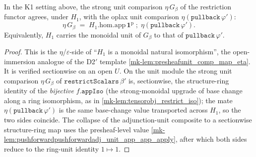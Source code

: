 \begin{lemma}\label{mk-lem:pushforward_eta_appiso_collapse}
  \leanok

  In the K1 setting above, the strong unit comparison \(\eta\,G_\beta\) of the restriction functor
  agrees, under \(H_1\), with the oplax unit comparison \(\eta(\mathtt{pullback}\,\varphi')\):
  \[
    \eta\,G_\beta
    \;=\;
    H_1.\mathrm{hom}.\mathrm{app}\,\mathbf{1}^{\mathrm p}
    \;\mathbin{;}\;
    \eta(\mathtt{pullback}\,\varphi').
  \]
  Equivalently, \(H_1\) carries the monoidal unit of \(G_\beta\) to that of
  \(\mathtt{pullback}\,\varphi'\).
\end{lemma}
\begin{proof}
  \leanok
  This is the $\eta$/$\varepsilon$-side of ``\(H_1\) is a monoidal natural isomorphism'', the
  open-immersion analogue of the D2$'$ template \ref{mk-lem:presheafunit_comp_map_eta}. It is
  verified sectionwise on an open \(U\). On the unit module the strong unit
  comparison \(\eta\,G_\beta\) of \(\mathtt{restrictScalars}\,\beta'\) is, sectionwise, the
  structure-ring identity of the \emph{bijective} \(f.\mathtt{appIso}\)
  (the strong-monoidal upgrade of base change along a ring isomorphism, as in
  \ref{mk-lem:tensorobj_restrict_iso}); the mate \(\eta(\mathtt{pullback}\,\varphi')\) is the same
  base-change value transported across \(H_1\), so the two sides coincide. The collapse of the
  adjunction-unit composite to a sectionwise structure-ring map uses the presheaf-level value
  \ref{mk-lem:pushforwardpushforwardadj_unit_app_app_apply}, after which both sides reduce to the
  ring-unit identity \(1 \mapsto 1\).
\end{proof}

